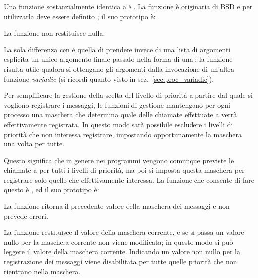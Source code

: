 Una funzione sostanzialmente identica a  è . La
funzione è originaria di BSD e per utilizzarla deve essere definito
; il suo prototipo è:

\begin{funcproto}{
}

{La funzione non restituisce nulla.}
\end{funcproto}

La sola differenza con  è quella di prendere invece di una lista
di argomenti esplicita un unico argomento finale passato nella forma di una
; la funzione risulta utile qualora si ottengano gli argomenti
dalla invocazione di un'altra funzione \textit{variadic} (si ricordi quanto
visto in sez.~\ref{sec:proc_variadic}).

Per semplificare la gestione della scelta del livello di priorità a partire
dal quale si vogliono registrare i messaggi, le funzioni di gestione
mantengono per ogni processo una maschera che determina quale delle chiamate
effettuate a  verrà effettivamente registrata.  In questo modo
sarà possibile escludere i livelli di priorità che non interessa registrare,
impostando opportunamente la maschera una volta per tutte.

Questo significa che in genere nei programmi vengono comunque previste le
chiamate a  per tutti i livelli di priorità, ma poi si imposta
questa maschera per registrare solo quello che effettivamente interessa. La
funzione che consente di fare questo è , ed il suo prototipo
è:

\begin{funcproto}{
}

{La funzione ritorna il precedente valore della maschera dei messaggi e non
  prevede errori.}
\end{funcproto}

La funzione restituisce il valore della maschera corrente, e se si passa un
valore nullo per  la maschera corrente non viene modificata; in
questo modo si può leggere il valore della maschera corrente. Indicando un
valore non nullo per  la registrazione dei messaggi viene
disabilitata per tutte quelle priorità che non rientrano nella maschera.


